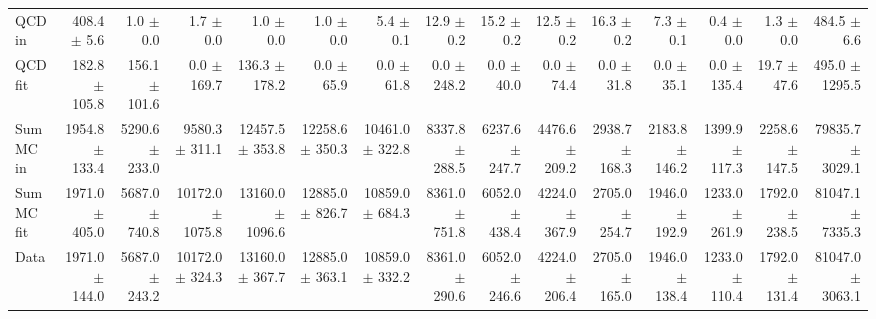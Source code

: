 \begin{table}[htbp]
{\begin{tabular}{lrrrrrrrrrrrrrr}
\hline
QCD in & 408.4 $\pm$ 5.6 & 1.0 $\pm$ 0.0 & 1.7 $\pm$ 0.0 & 1.0 $\pm$ 0.0 & 1.0 $\pm$ 0.0 & 5.4 $\pm$ 0.1 & 12.9 $\pm$ 0.2 & 15.2 $\pm$ 0.2 & 12.5 $\pm$ 0.2 & 16.3 $\pm$ 0.2 & 7.3 $\pm$ 0.1 & 0.4 $\pm$ 0.0 & 1.3 $\pm$ 0.0 & 484.5 $\pm$ 6.6 \\
QCD fit & 182.8 $\pm$ 105.8 & 156.1 $\pm$ 101.6 & 0.0 $\pm$ 169.7 & 136.3 $\pm$ 178.2 & 0.0 $\pm$ 65.9 & 0.0 $\pm$ 61.8 & 0.0 $\pm$ 248.2 & 0.0 $\pm$ 40.0 & 0.0 $\pm$ 74.4 & 0.0 $\pm$ 31.8 & 0.0 $\pm$ 35.1 & 0.0 $\pm$ 135.4 & 19.7 $\pm$ 47.6 & 495.0 $\pm$ 1295.5 \\
\hline
Sum MC in & 1954.8 $\pm$ 133.4 & 5290.6 $\pm$ 233.0 & 9580.3 $\pm$ 311.1 & 12457.5 $\pm$ 353.8 & 12258.6 $\pm$ 350.3 & 10461.0 $\pm$ 322.8 & 8337.8 $\pm$ 288.5 & 6237.6 $\pm$ 247.7 & 4476.6 $\pm$ 209.2 & 2938.7 $\pm$ 168.3 & 2183.8 $\pm$ 146.2 & 1399.9 $\pm$ 117.3 & 2258.6 $\pm$ 147.5& 79835.7 $\pm$ 3029.1 \\
Sum MC fit & 1971.0 $\pm$ 405.0 & 5687.0 $\pm$ 740.8 & 10172.0 $\pm$ 1075.8 & 13160.0 $\pm$ 1096.6 & 12885.0 $\pm$ 826.7 & 10859.0 $\pm$ 684.3 & 8361.0 $\pm$ 751.8 & 6052.0 $\pm$ 438.4 & 4224.0 $\pm$ 367.9 & 2705.0 $\pm$ 254.7 & 1946.0 $\pm$ 192.9 & 1233.0 $\pm$ 261.9 & 1792.0 $\pm$ 238.5 & 81047.1 $\pm$ 7335.3 \\
\hline
Data & 1971.0 $\pm$ 144.0 & 5687.0 $\pm$ 243.2 & 10172.0 $\pm$ 324.3 & 13160.0 $\pm$ 367.7 & 12885.0 $\pm$ 363.1 & 10859.0 $\pm$ 332.2 & 8361.0 $\pm$ 290.6 & 6052.0 $\pm$ 246.6 & 4224.0 $\pm$ 206.4 & 2705.0 $\pm$ 165.0 & 1946.0 $\pm$ 138.4 & 1233.0 $\pm$ 110.4 & 1792.0 $\pm$ 131.4 & 81047.0 $\pm$ 3063.1 \\
\hline
\end{tabular}
}
\end{table}

